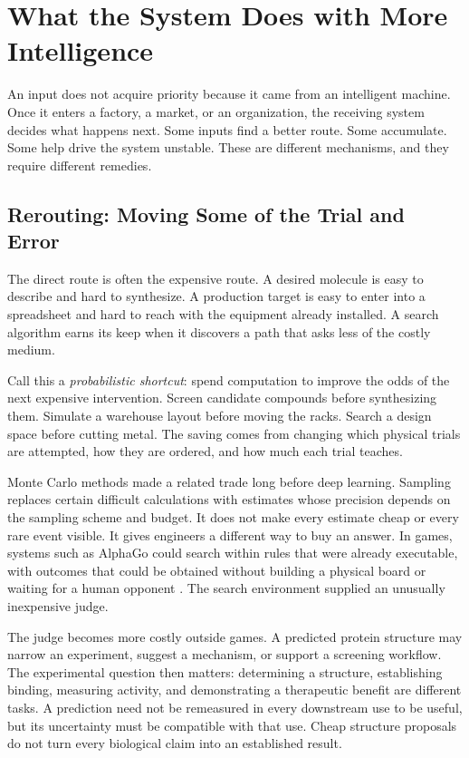 \section{What the System Does with More Intelligence}

An input does not acquire priority because it came from an intelligent machine. Once it enters a factory, a market, or an organization, the receiving system decides what happens next. Some inputs find a better route. Some accumulate. Some help drive the system unstable. These are different mechanisms, and they require different remedies.

\subsection{Rerouting: Moving Some of the Trial and Error}

The direct route is often the expensive route. A desired molecule is easy to describe and hard to synthesize. A production target is easy to enter into a spreadsheet and hard to reach with the equipment already installed. A search algorithm earns its keep when it discovers a path that asks less of the costly medium.

Call this a \emph{probabilistic shortcut}: spend computation to improve the odds of the next expensive intervention. Screen candidate compounds before synthesizing them. Simulate a warehouse layout before moving the racks. Search a design space before cutting metal. The saving comes from changing which physical trials are attempted, how they are ordered, and how much each trial teaches.

Monte Carlo methods made a related trade long before deep learning. Sampling replaces certain difficult calculations with estimates whose precision depends on the sampling scheme and budget. It does not make every estimate cheap or every rare event visible. It gives engineers a different way to buy an answer. In games, systems such as AlphaGo could search within rules that were already executable, with outcomes that could be obtained without building a physical board or waiting for a human opponent \cite{silver2016mastering}. The search environment supplied an unusually inexpensive judge.

The judge becomes more costly outside games. A predicted protein structure may narrow an experiment, suggest a mechanism, or support a screening workflow. The experimental question then matters: determining a structure, establishing binding, measuring activity, and demonstrating a therapeutic benefit are different tasks. A prediction need not be remeasured in every downstream use to be useful, but its uncertainty must be compatible with that use. Cheap structure proposals do not turn every biological claim into an established result.

